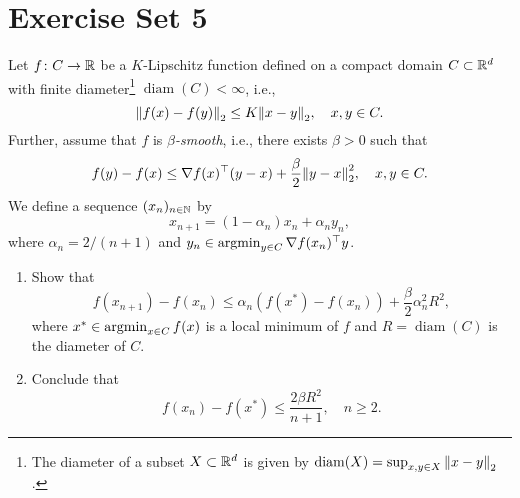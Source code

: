 \section{Exercise Set 5}

\begin{exercise}
\end{exercise}


\begin{exercise}
\end{exercise}


\begin{exercise}
Let $f \colon C \to \mathbb{R}$ be a $K$-Lipschitz function defined on a compact domain $C \subset \mathbb{R}^d$ with finite diameter\footnote{The diameter of a subset $X \subset \mathbb{R}^d$ is given by $\operatorname{diam}(X) = \sup_{x, y \in X} \norm{x - y}_2$.} $\operatorname{diam}(C) < \infty$, i.e.,
\[
    \norm{f(x) - f(y)}_2 \leq K \norm{x - y}_2, \quad x, y \in C.
\]
Further, assume that $f$ is \emph{$\beta$-smooth}, i.e., there exists $\beta > 0$ such that
\[
    f(y) - f(x) \leq \nabla f(x)^{\top} (y - x) + \frac{\beta}{2} \norm{y - x}_2^2, \quad x, y \in C.
\]
We define a sequence $(x_n)_{n \in \mathbb{N}}$ by
\[
    x_{n+1} = (1 - \alpha_n)x_n + \alpha_n y_n,
\]
where $\alpha_n = 2 / (n+1)$ and $y_n \in \operatorname*{argmin}_{y \in C} \nabla f(x_n)^{\top} y$.
\begin{enumerate}
    \item Show that
            \[
                f(x_{n+1}) - f(x_n) \leq \alpha_n (f(x^*) - f(x_n)) + \frac{\beta}{2} \alpha_n^2 R^2,
            \]
        where $x^{*} \in \operatorname*{argmin}_{x \in C} f(x)$ is a local minimum of $f$ and $R = \operatorname{diam}(C)$ is the diameter of $C$.

    \item Conclude that
            \[
                f(x_n) - f(x^*) \leq \frac{2 \beta R^2}{n + 1}, \quad n \geq 2.
            \]
\end{enumerate}
\end{exercise}
